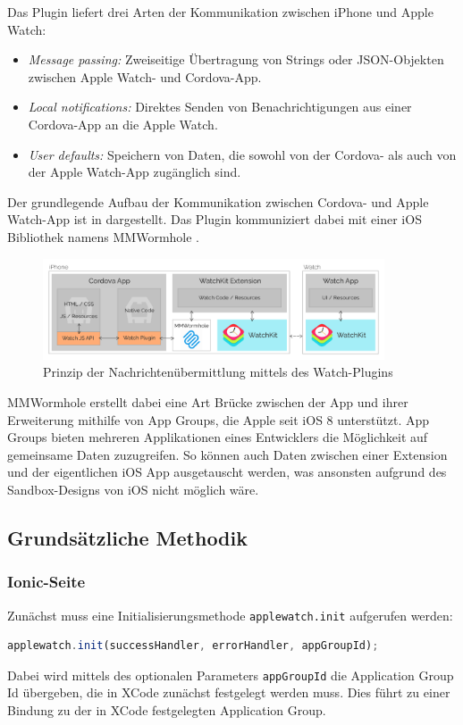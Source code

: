Das Plugin liefert drei Arten der Kommunikation zwischen iPhone und Apple Watch:
\begin{itemize}
    \item \emph{Message passing:} Zweiseitige Übertragung von Strings oder JSON-Objekten zwischen Apple Watch- und Cordova-App.
    \item \emph{Local notifications:} Direktes Senden von Benachrichtigungen aus einer Cordova-App an die Apple Watch.
    \item \emph{User defaults:} Speichern von Daten, die sowohl von der Cordova- als auch von der Apple Watch-App zugänglich sind.
\end{itemize}
%
Der grundlegende Aufbau der Kommunikation zwischen Cordova- und Apple Watch-App ist in  dargestellt. Das Plugin kommuniziert dabei mit einer iOS Bibliothek namens MMWormhole \cite{gitMMWormhole}. 
%
\begin{figure}[!htb] 
	\centering
	\includegraphics[width=0.9\textwidth]{data/bilder/apple-watch-plugin.png}
	\caption{Prinzip der Nachrichtenübermittlung mittels des Watch-Plugins \cite{CrossleyCordovaAppleWatchPlugin}}
	\label{fig:watchPlugin}
\end{figure}
%
MMWormhole erstellt dabei eine Art Brücke zwischen der App und ihrer Erweiterung mithilfe von App Groups, die Apple seit iOS 8 unterstützt. App Groups bieten mehreren Applikationen eines Entwicklers die Möglichkeit auf gemeinsame Daten zuzugreifen. So können auch Daten zwischen einer Extension und der eigentlichen iOS App ausgetauscht werden, was ansonsten aufgrund des Sandbox-Designs von iOS nicht möglich wäre.
%
%
\subsection{Grundsätzliche Methodik} 
%
\subsubsection{Ionic-Seite}
%
Zunächst muss eine Initialisierungsmethode \texttt{applewatch.init} aufgerufen werden:
\begin{lstlisting}[language=JavaScript]
applewatch.init(successHandler, errorHandler, appGroupId);
\end{lstlisting}
Dabei wird mittels des optionalen Parameters \texttt{appGroupId} die Application Group Id übergeben, die in XCode zunächst festgelegt werden muss. Dies führt zu einer Bindung zu der in XCode festgelegten Application Group.


